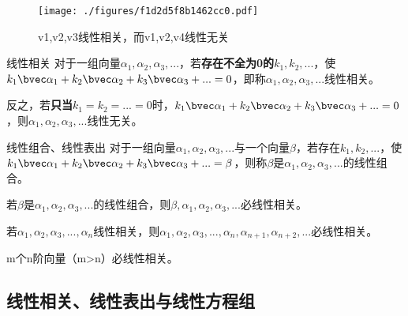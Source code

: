 

\begin{issues}
\end{issues}


\begin{figure}[ht]
\centering
\texttt{[image: ./figures/f1d2d5f8b1462cc0.pdf]}
\caption{v1,v2,v3线性相关，而v1,v2,v4线性无关} \label{fig_LnDpd2_1}
\end{figure}

\begin{definition}{线性相关}
对于一组向量$\alpha_1, \alpha_2,\alpha_3,...$，若\textbf{存在不全为0的}$k_1,k_2,...$，使$k_1 \bvec \alpha_1+k_2 \bvec \alpha_2+k_3 \bvec \alpha_3+...=0$，即称$\alpha_1, \alpha_2,\alpha_3,...$线性相关。

反之，若\textbf{只当}$k_1=k_2=...=0$时，$k_1 \bvec \alpha_1+k_2 \bvec \alpha_2+k_3 \bvec \alpha_3+...=0$，则$\alpha_1, \alpha_2,\alpha_3,...$线性无关。
\end{definition}

\begin{definition}{线性组合、线性表出}
对于一组向量$\alpha_1, \alpha_2,\alpha_3,...$与一个向量$\beta$，若存在$k_1,k_2,...$，使$k_1 \bvec \alpha_1+k_2 \bvec \alpha_2+k_3 \bvec \alpha_3+...=\beta$，则称$\beta$是$\alpha_1, \alpha_2,\alpha_3,...$的线性组合。
\end{definition}

\begin{theorem}{}
若$\beta$是$\alpha_1, \alpha_2,\alpha_3,...$的线性组合，则$\beta, \alpha_1, \alpha_2,\alpha_3,...$必线性相关。
\end{theorem}

\begin{theorem}{}
若$\alpha_1, \alpha_2,\alpha_3,...,\alpha_n$线性相关，则$\alpha_1, \alpha_2,\alpha_3,...,\alpha_n,\alpha_{n+1},\alpha_{n+2},...$必线性相关。
\end{theorem}

\begin{theorem}{}
m个n阶向量（m>n）必线性相关。
\end{theorem}

\subsection{线性相关、线性表出与线性方程组}

